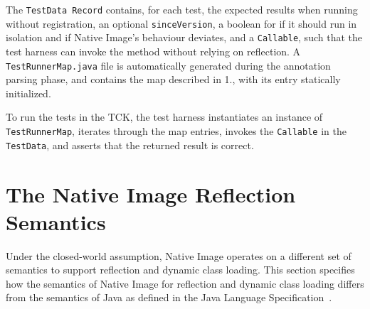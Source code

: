 The \verb|TestData Record| contains, for each test, the expected results when running without registration, an optional \verb|sinceVersion|, a boolean for if it should run in isolation and if Native Image's behaviour deviates, and a \verb|Callable|, such that the test harness can invoke the method without relying on reflection.  
A \verb|TestRunnerMap.java| file is automatically generated during the annotation parsing phase, and contains the map described in 1., with its entry statically initialized. 

To run the tests in the TCK, the test harness instantiates an instance of \verb|TestRunnerMap|, iterates through the map entries, invokes the \verb|Callable| in the \verb|TestData|, and asserts that the returned result is correct.


\chapter{The Native Image Reflection Semantics}\label{native_image_specs}
Under the closed-world assumption, Native Image operates on a different set of semantics to support reflection and dynamic class loading. This section specifies how the semantics of Native Image for reflection and dynamic class loading differs from the semantics of Java as defined in the Java Language Specification~\cite{noauthor_java_nodate-3}.


